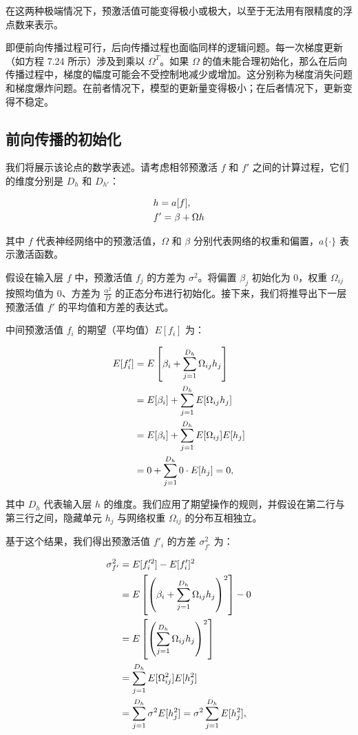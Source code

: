 \documentclass[lang=cn,newtx,10pt,scheme=chinese]{elegantbook}
\begin{document}
在这两种极端情况下，预激活值可能变得极小或极大，以至于无法用有限精度的浮点数来表示。

即便前向传播过程可行，后向传播过程也面临同样的逻辑问题。每一次梯度更新（如方程 7.24 所示）涉及到乘以 \(\Omega^T\)。如果 \(\Omega\) 的值未能合理初始化，那么在后向传播过程中，梯度的幅度可能会不受控制地减少或增加。这分别称为梯度消失问题和梯度爆炸问题。在前者情况下，模型的更新量变得极小；在后者情况下，更新变得不稳定。

\subsection{前向传播的初始化}
我们将展示该论点的数学表述。请考虑相邻预激活 \(f\) 和 \(f'\) 之间的计算过程，它们的维度分别是 \(D_h\) 和 \(D_{h'}\)：


\begin{align}
&h = a[f], \notag \\
&f' = \beta + \Omega h 
\end{align} 


其中 \(f\) 代表神经网络中的预激活值，\(\Omega\) 和 \(\beta\) 分别代表网络的权重和偏置，\(a\{\cdot\}\) 表示激活函数。

假设在输入层 \(f\) 中，预激活值 \(f_j\) 的方差为 \(\sigma^2\)。将偏置 \(\beta_j\) 初始化为 0，权重 \(\Omega_{ij}\) 按照均值为 0、方差为 \(\frac{\alpha^2}{D}\) 的正态分布进行初始化。接下来，我们将推导出下一层预激活值 \(f'\) 的平均值和方差的表达式。

中间预激活值 \(f_i\) 的期望（平均值）\(E[f_i]\) 为：



\begin{align}
E[f_i^\prime] &= E\left[\beta_i + \sum_{j=1}^{D_h} \Omega_{ij}h_j \right] \notag  \\
&= E[\beta_i] + \sum_{j=1}^{D_h} E[\Omega_{ij}h_j] \notag \\
&= E[\beta_i] + \sum_{j=1}^{D_h} E[\Omega_{ij}] E[h_j] \notag \\
&= 0 + \sum_{j=1}^{D_h} 0 \cdot E[h_j] = 0 , 
\end{align}


其中 \(D_h\) 代表输入层 \(h\) 的维度。我们应用了期望操作的规则，并假设在第二行与第三行之间，隐藏单元 \(h_j\) 与网络权重 \(\Omega_{ij}\) 的分布互相独立。

基于这个结果，我们得出预激活值 \(f'_i\) 的方差 \(\sigma_{f'}^2\) 为：



\begin{align}
\sigma_{f'}^2 &= E[f_i'^2] - E[f_i']^2 \notag \\
&= E\left[\left(\beta_i + \sum_{j=1}^{D_h} \Omega_{ij}h_j \right)^2\right] - 0 \notag \\
&= E\left[\left( \sum_{j=1}^{D_h} \Omega_{ij}h_j \right)^2\right] \notag \\
&= \sum_{j=1}^{D_h} E[\Omega_{ij}^2] E[h_j^2] \notag \\
&= \sum_{j=1}^{D_h} \sigma^2 E[h_j^2] = \sigma^2 \sum_{j=1}^{D_h} E[h_j^2], 
\end{align} 
\end{document}

